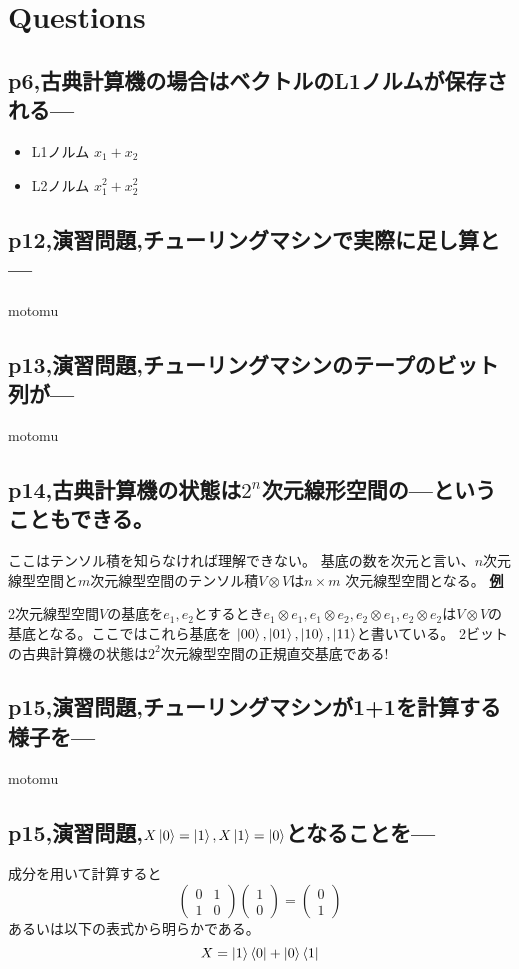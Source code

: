 \documentclass[b5paper,fleqn]{ltjsarticle}
\newcommand\s[1]{\subsection*{#1}\noindent\ignorespaces}
\newcommand\mat[2]{\left(\begin{array}{#1}#2\end{array}\right)}
\begin{document}
\section{Questions}
\s{p6,古典計算機の場合はベクトルのL1ノルムが保存される---}
\begin{itemize}
  \item L1ノルム $x_1+x_2$
  \item L2ノルム $x_1^2+x_2^2$
\end{itemize}
\s{p12,演習問題,チューリングマシンで実際に足し算と---}
motomu
\s{p13,演習問題,チューリングマシンのテープのビット列が---}
motomu
\s{p14,古典計算機の状態は$2^n$次元線形空間の---ということもできる。}
ここはテンソル積を知らなければ理解できない。
基底の数を次元と言い、$n$次元線型空間と$m$次元線型空間のテンソル積$V\otimes V$は$n\times m$
次元線型空間となる。\vskip5pt
\underline{\bf 例}\par\noindent
2次元線型空間$V$の基底を$e_1,e_2$とするとき$e_1\otimes e_1,e_1\otimes e_2,e_2\otimes e_1,
e_2\otimes e_2$は$V\otimes V$の基底となる。ここではこれら基底を
$\ket{00},\ket{01},\ket{10},\ket{11}$と書いている。
2ビットの古典計算機の状態は$2^2$次元線型空間の正規直交基底である!
\s{p15,演習問題,チューリングマシンが1+1を計算する様子を---}
motomu
\s{p15,演習問題,$X\ket{0}=\ket{1},X\ket{1}=\ket{0}$となることを---}
成分を用いて計算すると
\[\mat{cc}{ 0&1\\ 1&0}
    \mat{c}{1\\0}=\mat{c}{0\\1}\]
あるいは以下の表式から明らかである。
\[X=\ket{1}\bra{0}+\ket{0}\bra{1}\]
\end{document}
